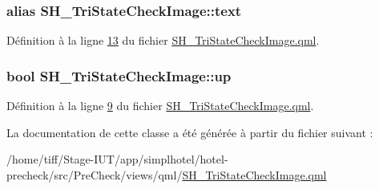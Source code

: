 \hypertarget{classSH__TriStateCheckImage_af1e4845c499b61447425538898cf9dbb}{
\subsubsection[{text}]{\setlength{\rightskip}{0pt plus 5cm}alias S\-H\-\_\-\-Tri\-State\-Check\-Image\-::text}}\label{classSH__TriStateCheckImage_af1e4845c499b61447425538898cf9dbb}


Définition à la ligne \hyperlink{SH__TriStateCheckImage_8qml_source_l00013}{13} du fichier \hyperlink{SH__TriStateCheckImage_8qml_source}{S\-H\-\_\-\-Tri\-State\-Check\-Image.\-qml}.

\hypertarget{classSH__TriStateCheckImage_a8a6a37f71149d3f918f642fa9d3e432c}{
\subsubsection[{up}]{\setlength{\rightskip}{0pt plus 5cm}bool S\-H\-\_\-\-Tri\-State\-Check\-Image\-::up}}\label{classSH__TriStateCheckImage_a8a6a37f71149d3f918f642fa9d3e432c}


Définition à la ligne \hyperlink{SH__TriStateCheckImage_8qml_source_l00009}{9} du fichier \hyperlink{SH__TriStateCheckImage_8qml_source}{S\-H\-\_\-\-Tri\-State\-Check\-Image.\-qml}.



La documentation de cette classe a été générée à partir du fichier suivant \-:\begin{DoxyCompactItemize}
\item 
/home/tiff/\-Stage-\/\-I\-U\-T/app/simplhotel/hotel-\/precheck/src/\-Pre\-Check/views/qml/\hyperlink{SH__TriStateCheckImage_8qml}{S\-H\-\_\-\-Tri\-State\-Check\-Image.\-qml}\end{DoxyCompactItemize}
